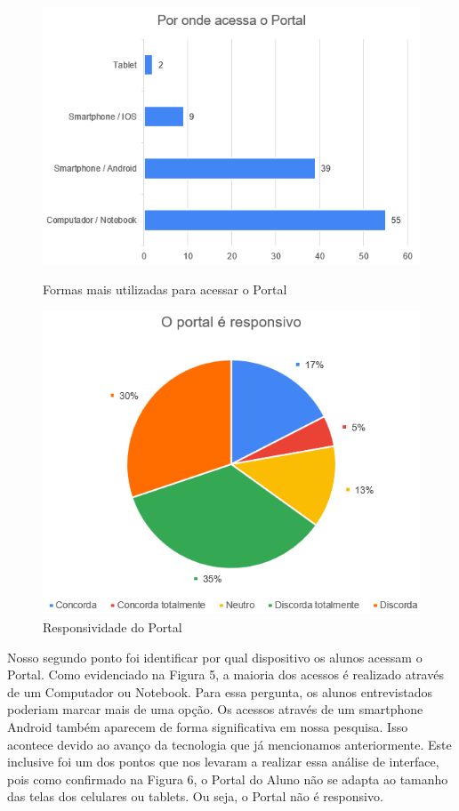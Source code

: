 \documentclass[12pt]{article}
\begin{document}
\begin{figure}
	\centering    
	\begin{minipage}{.4\columnwidth}
		\centering    
		\includegraphics[width=\textwidth,frame]{img5.png}
		\caption{Formas mais utilizadas para acessar o Portal}
		\label{fig:grafico2}
	\end{minipage}
	\begin{minipage}{.4\columnwidth}
		\centering
		\includegraphics[width=\textwidth,frame]{img6.png}
		\caption{Responsividade do Portal}
		\label{fig:grafico3}
	\end{minipage}
\end{figure}

Nosso segundo ponto foi identificar por qual dispositivo os alunos acessam o Portal. Como evidenciado na Figura 5, a maioria dos acessos é realizado através de um Computador ou Notebook. Para essa pergunta, os alunos entrevistados poderiam marcar mais de uma opção. Os acessos através de um smartphone Android também aparecem de forma significativa em nossa pesquisa. Isso acontece devido ao avanço da tecnologia que já mencionamos anteriormente. Este inclusive foi um dos pontos que nos levaram a realizar essa análise de interface, pois como confirmado na Figura 6, o Portal do Aluno não se adapta ao tamanho das telas dos celulares ou tablets. Ou seja, o Portal não é responsivo.
\end{document}
